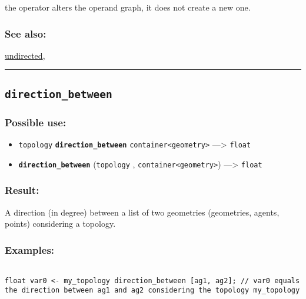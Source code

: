 \documentclass[]{book}
\providecommand{\tightlist}{%
  \setlength{\itemsep}{0pt}\setlength{\parskip}{0pt}}
\theoremstyle{definition}
\theoremstyle{definition}
\theoremstyle{definition}
\theoremstyle{remark}
\begin{document}
the operator alters the operand graph, it does not create a new one.

\subsubsection{See also:}\label{see-also-77}

\href{OperatorsSZ\#undirected}{undirected},

\begin{center}\rule{0.5\linewidth}{\linethickness}\end{center}

\subsection{\texorpdfstring{\texttt{direction\_between}}{direction\_between}}\label{direction_between}

\subsubsection{Possible use:}\label{possible-use-133}

\begin{itemize}
\tightlist
\item
  \texttt{topology} \textbf{\texttt{direction\_between}}
  \texttt{container\textless{}geometry\textgreater{}} ---\textgreater{}
  \texttt{float}
\item
  \textbf{\texttt{direction\_between}} (\texttt{topology} ,
  \texttt{container\textless{}geometry\textgreater{}}) ---\textgreater{}
  \texttt{float}
\end{itemize}

\subsubsection{Result:}\label{result-129}

A direction (in degree) between a list of two geometries (geometries,
agents, points) considering a topology.

\subsubsection{Examples:}\label{examples-100}

\begin{verbatim}
 
float var0 <- my_topology direction_between [ag1, ag2]; // var0 equals the direction between ag1 and ag2 considering the topology my_topology
\end{verbatim}
\end{document}
